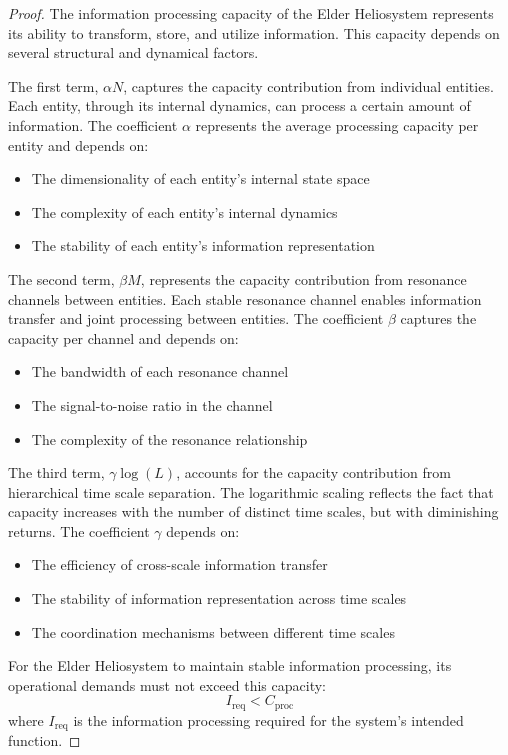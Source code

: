 \begin{proof}
The information processing capacity of the Elder Heliosystem represents its ability to transform, store, and utilize information. This capacity depends on several structural and dynamical factors.

The first term, $\alpha N$, captures the capacity contribution from individual entities. Each entity, through its internal dynamics, can process a certain amount of information. The coefficient $\alpha$ represents the average processing capacity per entity and depends on:
\begin{itemize}
    \item The dimensionality of each entity's internal state space
    \item The complexity of each entity's internal dynamics
    \item The stability of each entity's information representation
\end{itemize}

The second term, $\beta M$, represents the capacity contribution from resonance channels between entities. Each stable resonance channel enables information transfer and joint processing between entities. The coefficient $\beta$ captures the capacity per channel and depends on:
\begin{itemize}
    \item The bandwidth of each resonance channel
    \item The signal-to-noise ratio in the channel
    \item The complexity of the resonance relationship
\end{itemize}

The third term, $\gamma \log(L)$, accounts for the capacity contribution from hierarchical time scale separation. The logarithmic scaling reflects the fact that capacity increases with the number of distinct time scales, but with diminishing returns. The coefficient $\gamma$ depends on:
\begin{itemize}
    \item The efficiency of cross-scale information transfer
    \item The stability of information representation across time scales
    \item The coordination mechanisms between different time scales
\end{itemize}

For the Elder Heliosystem to maintain stable information processing, its operational demands must not exceed this capacity:
\begin{equation}
I_{\text{req}} < C_{\text{proc}}
\end{equation}
where $I_{\text{req}}$ is the information processing required for the system's intended function.


\end{proof}
